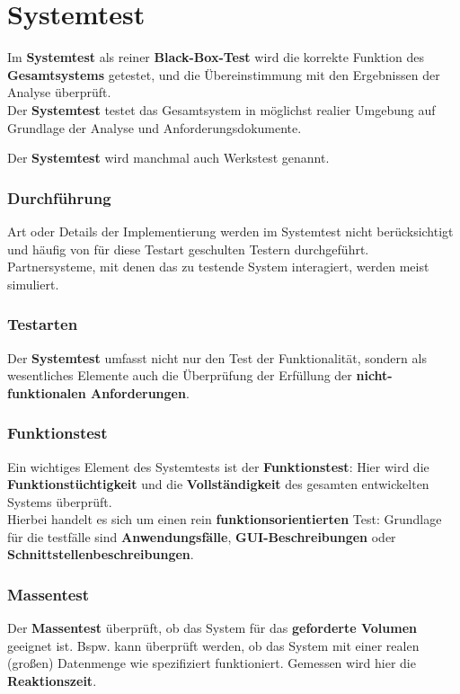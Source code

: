 \section{Systemtest}

\begin{tcolorbox}[title=Systemtest]
    Im \textbf{Systemtest} als reiner \textbf{Black-Box-Test} wird die korrekte Funktion des \textbf{Gesamtsystems} getestet, und die Übereinstimmung mit den Ergebnissen der Analyse überprüft.\\
    Der \textbf{Systemtest} testet das Gesamtsystem in möglichst realier Umgebung auf Grundlage der Analyse und Anforderungsdokumente.
\end{tcolorbox}

\noindent
Der \textbf{Systemtest} wird manchmal auch Werkstest genannt.

\subsubsection*{Durchführung}
Art oder Details der Implementierung werden im Systemtest nicht berücksichtigt und häufig von für diese Testart geschulten Testern durchgeführt. Partnersysteme, mit denen das zu testende System interagiert, werden meist simuliert.

\subsubsection*{Testarten}
Der \textbf{Systemtest} umfasst nicht nur den Test der Funktionalität, sondern als wesentliches Elemente auch die Überprüfung der Erfüllung der \textbf{nicht-funktionalen Anforderungen}.

\subsubsection*{Funktionstest}
Ein wichtiges Element des Systemtests ist der \textbf{Funktionstest}: Hier wird die \textbf{Funktionstüchtigkeit} und die \textbf{Vollständigkeit} des gesamten entwickelten Systems überprüft.\\
Hierbei handelt es sich um einen rein \textbf{funktionsorientierten} Test: Grundlage für die testfälle sind \textbf{Anwendungsfälle}, \textbf{GUI-Beschreibungen} oder \textbf{Schnittstellenbeschreibungen}.

\subsubsection*{Massentest}
Der \textbf{Massentest} überprüft, ob das System für das \textbf{geforderte Volumen} geeignet ist.
Bspw. kann überprüft werden, ob das System mit einer realen (großen) Datenmenge wie spezifiziert funktioniert.
Gemessen wird hier die \textbf{Reaktionszeit}.

